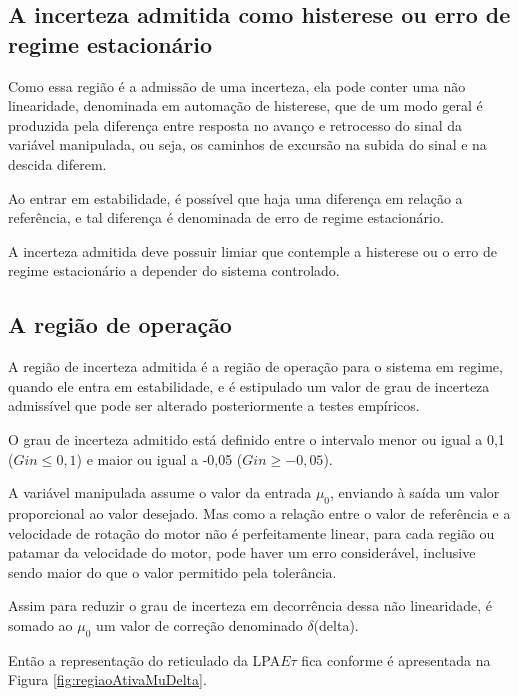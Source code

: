 \subsection{A incerteza admitida como histerese ou erro de regime estacionário}

Como essa região é a admissão de uma incerteza,
ela pode conter uma não linearidade,
denominada em automação de histerese,
que de um modo geral é produzida pela diferença entre resposta
no avanço e retrocesso do sinal da variável manipulada,
ou seja,
os caminhos de excursão na subida do sinal e na descida diferem.

Ao entrar em estabilidade,
é possível que haja uma diferença em relação a referência,
e tal diferença é denominada de erro de regime estacionário.

A incerteza admitida deve possuir limiar que contemple
a histerese ou o erro de regime estacionário
a depender do sistema controlado. 


\subsection{ A região de operação }

A região de incerteza admitida é a região de operação para o sistema em regime, 
quando ele entra em estabilidade,
e é estipulado um valor de grau de incerteza admissível que 
pode ser alterado posteriormente a testes empíricos.

O grau de incerteza admitido está definido entre
o intervalo menor ou igual a 0,1 ($Gin \le 0,1$) 
e maior ou igual a -0,05 ($Gin \ge -0,05$).




A variável manipulada assume o valor da entrada $\mu_0$,
enviando à saída um valor proporcional ao valor desejado.
Mas como a relação entre o valor de referência e a 
velocidade de rotação do motor não é perfeitamente linear,
para cada região ou patamar da velocidade do motor,
pode haver um erro considerável,
inclusive sendo maior do que o valor permitido pela 
tolerância. 

Assim para reduzir o grau de incerteza
em decorrência dessa não linearidade, 
é somado ao $\mu_0$ um valor de correção denominado $\delta$(delta).

Então a representação do reticulado da LPA$E\tau$ 
fica conforme é apresentada na Figura \ref{fig:regiaoAtivaMuDelta}. 





